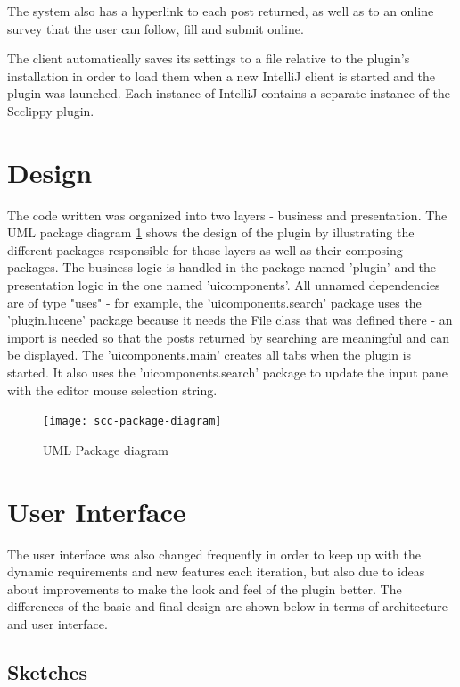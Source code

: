 \documentclass{l4proj}
\begin{document}
The system also has a hyperlink to each post returned, as well as to an online survey that the user can follow, fill and submit online. 

The client automatically saves its settings to a file relative to the plugin's installation in order to load them when a new IntelliJ client is started and the plugin was launched. Each instance of IntelliJ contains a separate instance of the Scclippy plugin.

\section{Design}

The code written was organized into two layers - business and presentation. The UML package diagram \ref{fig:scc-package-diagram} shows the design of the plugin by illustrating the different packages responsible for those layers as well as their composing packages. The business logic is handled in the package named 'plugin' and the presentation logic in the one named 'uicomponents'. All unnamed dependencies are of type "uses" - for example, the 'uicomponents.search' package uses the 'plugin.lucene' package because it needs the File class that was defined there - an import is needed so that the posts returned by searching are meaningful and can be displayed. The 'uicomponents.main' creates all tabs when the plugin is started. It also uses the 'uicomponents.search' package to update the input pane with the editor mouse selection string.

\begin{figure}[H]
\texttt{[image: scc-package-diagram]}
\centering
\caption{UML Package diagram}
\label{fig:scc-package-diagram}
\end{figure}

\section{User Interface}
The user interface was also changed frequently in order to keep up with the dynamic requirements and new features each iteration, but also due to ideas about improvements to make the look and feel of the plugin better. The differences of the basic and final design are shown below in terms of architecture and user interface.

\subsection{Sketches}
\end{document}
